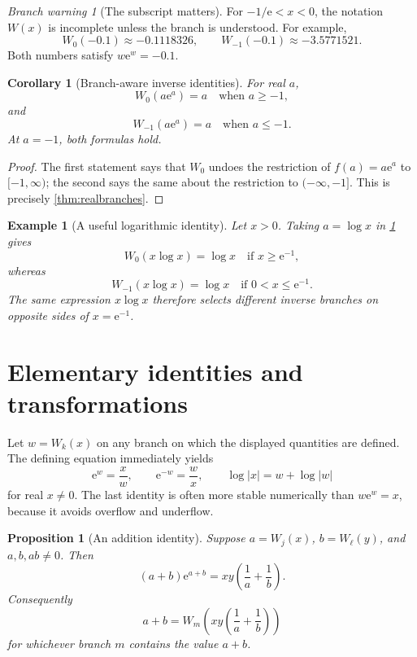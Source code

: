 \documentclass[11pt]{article}
\newtheorem{proposition}[theorem]{Proposition}
\newtheorem{corollary}[theorem]{Corollary}
\newtheorem{example}[theorem]{Example}
\theoremstyle{remark}
\newtheorem{warning}[theorem]{Branch warning}
\newcommand{\Wz}{W_0}
\newcommand{\Wm}{W_{-1}}
\newcommand{\ee}{\mathrm e}
\newcommand{\abs}[1]{\left|#1\right|}
\begin{document}
\begin{warning}[The subscript matters]\label{warn:branch}
For \(-1/\ee<x<0\), the notation \(W(x)\) is incomplete unless the branch is
understood.  For example,
\[
 \Wz(-0.1)\approx-0.1118326,\qquad
 \Wm(-0.1)\approx-3.5771521.
\]
Both numbers satisfy \(w\ee^w=-0.1\).
\end{warning}

\begin{corollary}[Branch-aware inverse identities]\label{cor:inverse}
For real \(a\),
\[
 \Wz(a\ee^a)=a\quad\text{when }a\geq-1,
\]
and
\[
 \Wm(a\ee^a)=a\quad\text{when }a\leq-1.
\]
At \(a=-1\), both formulas hold.
\end{corollary}

\begin{proof}
The first statement says that \(\Wz\) undoes the restriction of
\(f(a)=a\ee^a\) to \([-1,\infty)\); the second says the same about the
restriction to \((-\infty,-1]\).  This is precisely
\cref{thm:realbranches}.
\end{proof}

\begin{example}[A useful logarithmic identity]\label{ex:xlogx}
Let \(x>0\).  Taking \(a=\log x\) in \cref{cor:inverse} gives
\[
 \Wz(x\log x)=\log x\quad\text{if }x\geq\ee^{-1},
\]
whereas
\[
 \Wm(x\log x)=\log x\quad\text{if }0<x\leq\ee^{-1}.
\]
The same expression \(x\log x\) therefore selects different inverse branches
on opposite sides of \(x=\ee^{-1}\).
\end{example}

\section{Elementary identities and transformations}\label{sec:identities}

Let \(w=W_k(x)\) on any branch on which the displayed quantities are defined.
The defining equation immediately yields
\begin{equation}\label{eq:basicidentities}
 \ee^w=\frac{x}{w},\qquad
 \ee^{-w}=\frac{w}{x},\qquad
 \log\abs{x}=w+\log\abs{w}
\end{equation}
for real \(x\neq0\).  The last identity is often more stable numerically than
\(w\ee^w=x\), because it avoids overflow and underflow.

\begin{proposition}[An addition identity]\label{prop:addition}
Suppose \(a=W_j(x)\), \(b=W_\ell(y)\), and \(a,b,ab\neq0\).  Then
\begin{equation}\label{eq:addition}
 (a+b)\ee^{a+b}
   =xy\left(\frac1a+\frac1b\right).
\end{equation}
Consequently
\[
 a+b=W_m\left(xy\left(\frac1a+\frac1b\right)\right)
\]
for whichever branch \(m\) contains the value \(a+b\).
\end{proposition}
\end{document}
